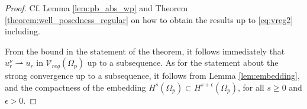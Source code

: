 \documentclass[report]{elsarticle}
\numberwithin{theorem}{section}
\renewcommand{\Im}{\operatorname{Im}}
\begin{document}
\begin{proof}
Cf. Lemma \ref{lem:pb_abs_wp} and Theorem \ref{theorem:well_posedness_regular} on how to obtain the results up to \eqref{eq:vreg2} including.
	
	From the bound in the statement of the theorem, it follows immediately that $u^{\nu}_r\rightharpoonup u_r$ in $\mathcal{V}_{reg}(\Omega_p)$ up to a subsequence. As for the statement about the strong convergence up to a subsequence, it follows from Lemma \ref{lem:embedding}, and the compactness of the embedding $H^s(\Omega_p)\subset H^{s+\epsilon}(\Omega_p)$, for all $s\geq 0$ and $\epsilon>0$.
	
	
	
	
	
	
\end{proof}
\end{document}
